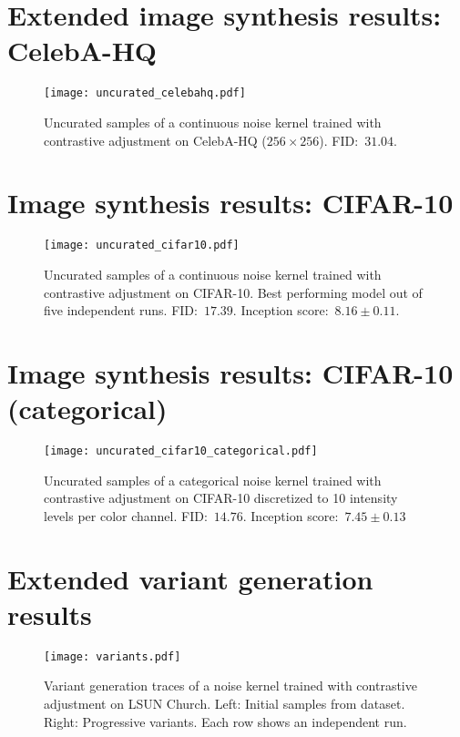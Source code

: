 \documentclass[10pt,twocolumn,letterpaper]{article}
\begin{document}
\newpage
\section{Extended image synthesis results: CelebA-HQ}\label{app:imagesynthesis:celebahq}
\begin{figure}[h!]
  \centering
  \texttt{[image: uncurated\_celebahq.pdf]}\caption{
    Uncurated samples of a continuous noise kernel trained with contrastive adjustment on CelebA-HQ ($256 \times 256$).
    FID:~$31.04$.
  }\end{figure}


\newpage
\section{Image synthesis results: CIFAR-10}\label{app:imagesynthesis:cifar10}

\begin{figure}[h!]
  \centering
  \texttt{[image: uncurated\_cifar10.pdf]}\caption{
    Uncurated samples of a continuous noise kernel trained with contrastive adjustment on CIFAR-10.
    Best performing model out of five independent runs.
    FID:~$17.39$. Inception score:~$8.16 \pm 0.11$.
  }\end{figure}


\newpage
\section{Image synthesis results: CIFAR-10 (categorical)}\label{app:imagesynthesis:cifar10:categorical}

\begin{figure}[h!]
  \centering
  \texttt{[image: uncurated\_cifar10\_categorical.pdf]}\caption{
    Uncurated samples of a categorical noise kernel trained with contrastive adjustment on CIFAR-10 discretized to 10 intensity levels per color channel.
    FID:~$14.76$. Inception score:~$7.45 \pm 0.13$
  }\end{figure}


\newpage
\section{Extended variant generation results}\label{app:imagevariants}

\begin{figure}[h!]
  \centering
  \texttt{[image: variants.pdf]}\caption{
    Variant generation traces of a noise kernel trained with contrastive adjustment on LSUN Church.
    Left: Initial samples from dataset.
    Right: Progressive variants.
    Each row shows an independent run.
  }\end{figure}
\end{document}
